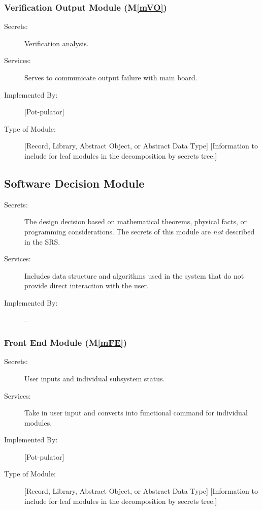 \documentclass[12pt, titlepage]{article}
\newcommand{\mref}[1]{M\ref{#1}}
\begin{document}
\subsubsection{Verification Output Module (\mref{mVO})}
\begin{description}
\item[Secrets:] Verification analysis.
\item[Services:] Serves to communicate output failure with main board.
\item[Implemented By:] [Pot-pulator]
\item[Type of Module:] [Record, Library, Abstract Object, or Abstract Data Type]
  [Information to include for leaf modules in the decomposition by secrets tree.]
\end{description}

\subsection{Software Decision Module}

\begin{description}
\item[Secrets:] The design decision based on mathematical theorems, physical
  facts, or programming considerations. The secrets of this module are
  \emph{not} described in the SRS.
\item[Services:] Includes data structure and algorithms used in the system that
  do not provide direct interaction with the user. 
\item[Implemented By:] --
\end{description}

\subsubsection{Front End Module (\mref{mFE})}
\begin{description}
\item[Secrets:] User inputs and individual subsystem status.
\item[Services:] Take in user input and converts into functional command for individual modules.
\item[Implemented By:] [Pot-pulator]
\item[Type of Module:] [Record, Library, Abstract Object, or Abstract Data Type]
  [Information to include for leaf modules in the decomposition by secrets tree.]
\end{description}
\end{document}
